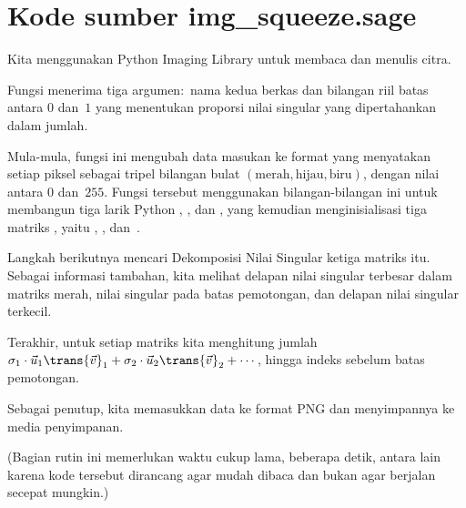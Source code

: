 \section{Kode sumber img\_squeeze.sage}
Kita menggunakan Python Imaging Library untuk membaca dan menulis citra.

Fungsi  menerima tiga argumen:~nama kedua berkas dan
bilangan riil batas antara $0$ dan~$1$ yang menentukan proporsi nilai
singular yang dipertahankan dalam jumlah.


Mula-mula, fungsi ini mengubah data masukan ke format yang menyatakan setiap
piksel sebagai tripel bilangan bulat
$(\text{merah},\text{hijau},\text{biru})$, dengan nilai antara $0$ dan~$255$.
Fungsi tersebut menggunakan bilangan-bilangan ini untuk membangun tiga larik
Python , , dan , yang kemudian
menginisialisasi tiga matriks \Sage{}, yaitu ,
, dan~.


Langkah berikutnya mencari Dekomposisi Nilai Singular ketiga matriks itu.
Sebagai informasi tambahan, kita melihat delapan nilai singular terbesar
dalam matriks merah, nilai singular pada batas pemotongan, dan delapan nilai
singular terkecil.


Terakhir, untuk setiap matriks kita menghitung jumlah
$\sigma_1\cdot\vec{u}_1\trans{\vec{v}}_1+\sigma_2\cdot\vec{u}_2\trans{\vec{v}}_2
   +\cdots\,$,
hingga indeks sebelum batas pemotongan.


Sebagai penutup, kita memasukkan data ke format PNG dan menyimpannya ke
media penyimpanan.

(Bagian rutin ini memerlukan waktu cukup lama, beberapa detik, antara lain
karena kode tersebut dirancang agar mudah dibaca dan bukan agar berjalan
secepat mungkin.)

\endinput
